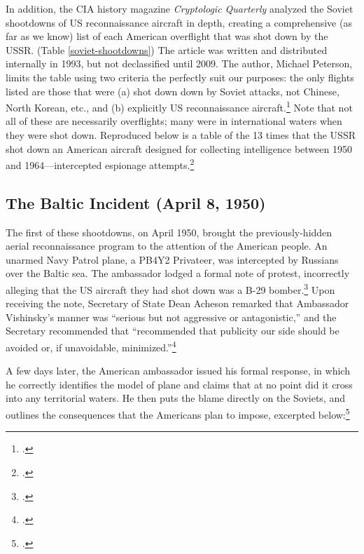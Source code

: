 \documentclass[12pt]{article}
\begin{document}
In addition, the CIA history magazine \emph{Cryptologic Quarterly} analyzed the Soviet shootdowns of US reconnaissance aircraft in depth, creating a comprehensive (as far as we know) list of each American overflight that was shot down by the USSR. (Table \ref{soviet-shootdowns}) The article was written and distributed internally in 1993, but not declassified until 2009. The author, Michael Peterson, limits the table using two criteria the perfectly suit our purposes: the only flights listed are those that were (a) shot down down by Soviet attacks, not Chinese, North Korean, etc., and (b) explicitly US reconnaissance aircraft.\footcite[p.~4]{peterson_maybe_1993} Note that not all of these are necessarily overflights; many were in international waters when they were shot down. Reproduced below is a table of the 13 times that the USSR shot down an American aircraft designed for collecting intelligence between 1950 and 1964---intercepted espionage attempts.\footcite[p.~5. In the original document, this table lists the first incident as having taken place over the Barents Sea, not the Baltic Sea. Because the description of the mission---including a map of its route in the same document---takes place entirely over the Baltic sea, I have concluded that this has to be a typographical error, and corrected it here.]{peterson_maybe_1993}

\subsection{The Baltic Incident (April 8, 1950)}

The first of these shootdowns, on April 1950, brought the previously-hidden aerial reconnaissance program to the attention of the American people. An unarmed Navy Patrol plane, a PB4Y2 Privateer, was intercepted by Russians over the Baltic sea. The ambassador lodged a formal note of protest, incorrectly alleging that the US aircraft they had shot down was a B-29 bomber.\footcite{kirk_ambassador_1950} Upon receiving the note, Secretary of State Dean Acheson remarked that Ambassador Vishinsky's manner was ``serious but not aggressive or antagonistic,'' and the Secretary recommended that ``recommended that publicity our side should be avoided or, if unavoidable, minimized.''\footcite{kirk_ambassador_1950}

A few days later, the American ambassador issued his formal response, in which he correctly identifies the model of plane and claims that at no point did it cross into any territorial waters. He then puts the blame directly on the Soviets, and outlines the consequences that the Americans plan to impose, excerpted below:\footcite{the_associated_press_text_1950}
\end{document}

